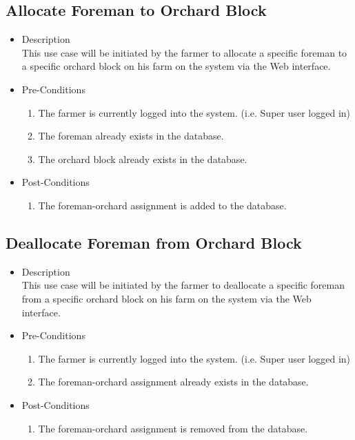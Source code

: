 \documentclass[11pt,fleqn]{book} %
\begin{document}
	\subsection{Allocate Foreman to Orchard Block}
	\begin{itemize}
		\item Description\\
		This use case will be initiated by the farmer to allocate a specific foreman to a specific orchard block on his farm on the system via the Web interface.
		\item Pre-Conditions
		\begin{enumerate}
			\item The farmer is currently logged into the system. (i.e. Super user logged in)
			\item The foreman already exists in the database. 
			\item The orchard block already exists in the database. 								
		\end{enumerate}
		\item Post-Conditions
		\begin{enumerate}
			\item The foreman-orchard assignment is added to the database.
		\end{enumerate}
	\end{itemize}
	
	\subsection{Deallocate Foreman from Orchard Block}
	\begin{itemize}
		\item Description\\
		This use case will be initiated by the farmer to deallocate a specific foreman from a specific orchard block on his farm on the system via the Web interface.
		\item Pre-Conditions
		\begin{enumerate}
			\item The farmer is currently logged into the system. (i.e. Super user logged in)
			\item The foreman-orchard assignment already exists in the database.		
		\end{enumerate}
		\item Post-Conditions
		\begin{enumerate}
			\item The foreman-orchard assignment is removed from the database.
		\end{enumerate}
	\end{itemize}
	
\end{document}
